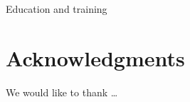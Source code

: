 \documentclass[ChapterTOCs,krantz2]{krantz} %
\theoremstyle{definition}
\begin{document}
%
%
%
%
%
%
%
%
%
%
%

Education and training

%
%
%
%
%
%
%
%
%
%
%
%
%
%
\section*{Acknowledgments}
We would like to thank \ldots



\end{document}
